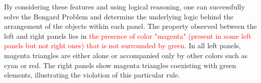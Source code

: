\begin{tcolorbox}[breakable,enhanced jigsaw,opacityback=0,]
\begin{dialogue}
		By considering these features and using logical reasoning, one can successfully solve the Bongard Problem and determine the underlying logic behind the arrangement of the objects within each panel.
		\vspace{1em}
		 The property observed between the left and right panels lies in \textcolor{red}{the presence of color "magenta" (present in some left panels but not right ones) that is not surrounded by green}. In all left panels, magenta triangles are either alone or accompanied only by other colors such as cyan or red. The right panels show magenta triangles coexisting with green elements, illustrating the violation of this particular rule.
	\end{dialogue}
	\label{fig:task11-bongard}
\end{tcolorbox}





